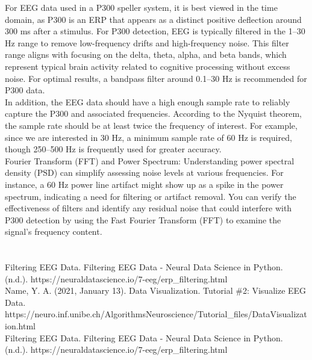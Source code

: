 \documentclass{article}
\begin{document}
For EEG data used in a P300 speller system, it is best viewed in the time domain, as P300 is an ERP that appears as a distinct positive deflection around 300 ms after a stimulus. For P300 detection, EEG is typically filtered in the 1–30 Hz range to remove low-frequency drifts and high-frequency noise. This filter range aligns with focusing on the delta, theta, alpha, and beta bands, which represent typical brain activity related to cognitive processing without excess noise. For optimal results, a bandpass filter around 0.1–30 Hz is recommended for P300 data. \\
In addition, the EEG data should have a high enough sample rate to reliably capture the P300 and associated frequencies. According to the Nyquist theorem, the sample rate should be at least twice the frequency of interest. For example, since we are interested in 30 Hz, a minimum sample rate of 60 Hz is required, though 250–500 Hz is frequently used for greater accuracy. \\
Fourier Transform (FFT) and Power Spectrum: Understanding power spectral density (PSD) can simplify assessing noise levels at various frequencies. For instance, a 60 Hz power line artifact might show up as a spike in the power spectrum, indicating a need for filtering or artifact removal. You can verify the effectiveness of filters and identify any residual noise that could interfere with P300 detection by using the Fast Fourier Transform (FFT) to examine the signal's frequency content. \\ \\ \\






Filtering EEG Data. Filtering EEG Data - Neural Data Science in Python. (n.d.). https://neuraldatascience.io/7-eeg/erp\_filtering.html \\
Name, Y. A. (2021, January 13). Data Visualization. Tutorial \#2: Visualize EEG Data. https://neuro.inf.unibe.ch/AlgorithmsNeuroscience/Tutorial\_files/DataVisualization.html \\
Filtering EEG Data. Filtering EEG Data - Neural Data Science in Python. (n.d.). https://neuraldatascience.io/7-eeg/erp\_filtering.html 
\end{document}

